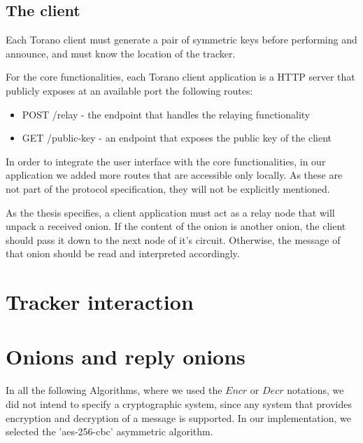 \subsection{The client}
Each Torano client must generate a pair of symmetric keys before performing and announce, and must know the location of the tracker. 

For the core functionalities, each Torano client application is a HTTP server that publicly exposes at an available port the following routes:

\begin{itemize}[leftmargin=1.5cm,labelindent=0cm]
    \item POST /relay - the endpoint that handles the relaying functionality
    \item GET /public-key - an endpoint that exposes the public key of the client
\end{itemize}

In order to integrate the user interface with the core functionalities, in our application we added more routes that are accessible only locally. As these are not part of the protocol specification, they will not be explicitly mentioned.

As the thesis specifies, a client application must act as a relay node that will unpack a received onion. If the content of the onion is another onion, the client should pass it down to the next node of it's circuit. Otherwise, the message of that onion should be read and interpreted accordingly.



\section{Tracker interaction}


\section{Onions and reply onions} \label{section:cells:implementation}

In all the following Algorithms, where we used the $ Encr $ or $ Decr $ notations, we did not intend to specify a cryptographic system, since any system that provides encryption and decryption of a message is supported. In our implementation, we selected the 'aes-256-cbc' asymmetric algorithm. 




